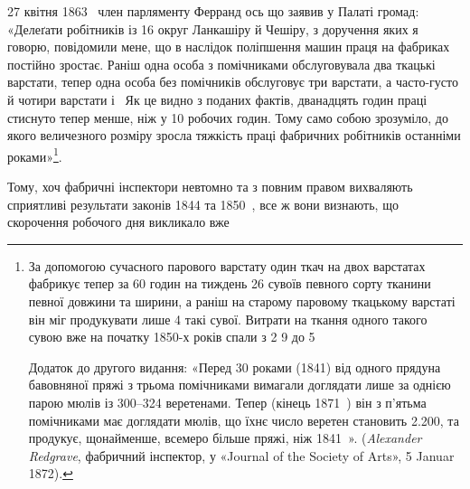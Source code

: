 27 квітня 1863~ член парляменту Ферранд ось що заявив у
Палаті громад: «Делеґати робітників із 16 округ Ланкашіру й
Чешіру, з доручення яких я говорю, повідомили мене, що в наслідок
поліпшення машин праця на фабриках постійно зростає.
Раніш одна особа з помічниками обслуговувала два ткацькі варстати,
тепер одна особа без помічників обслуговує три варстати,
а часто-густо й чотири варстати і~ Як це видно з поданих
фактів, дванадцять годин праці стиснуто тепер менше, ніж у
10 робочих годин. Тому само собою зрозуміло, до якого величезного
розміру зросла тяжкість праці фабричних робітників останніми
роками»\footnote{
За допомогою сучасного парового варстату один ткач на двох
варстатах фабрикує тепер за 60 годин на тиждень 26 сувоїв певного сорту
тканини певної довжини та ширини, а раніш на старому паровому ткацькому
варстаті він міг продукувати лише 4 такі сувої. Витрати на ткання
одного такого сувою вже на початку 1850-х років спали з 2
9 до 5

Додаток до другого видання: «Перед 30 роками (1841) від одного прядуна
бавовняної пряжі з трьома помічниками вимагали доглядати лише
за однією парою мюлів із 300--324 веретенами. Тепер (кінець 1871~)
він з п’ятьма помічниками має доглядати мюлів, що їхнє число веретен
становить \num{2.200}, та продукує, щонайменше, всемеро більше пряжі, ніж
1841~». (\emph{Alexander Redgrave}, фабричний інспектор, у «Journal of
the Society of Arts», 5 Januar 1872).
}.

Тому, хоч фабричні інспектори невтомно та з повним правом
вихваляють сприятливі результати законів 1844 та 1850~,
все ж вони визнають, що скорочення робочого дня викликало вже
\parbreak{}  %
